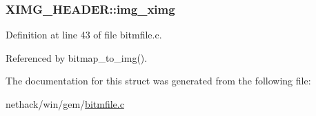 \hypertarget{structXIMG__HEADER_aaeba1879c57396ae9d15c097113b07c5}{
\subsubsection[{img\+\_\+ximg}]{ X\+I\+M\+G\+\_\+\+H\+E\+A\+D\+E\+R\+::img\+\_\+ximg}}\label{structXIMG__HEADER_aaeba1879c57396ae9d15c097113b07c5}


Definition at line 43 of file bitmfile.\+c.



Referenced by bitmap\+\_\+to\+\_\+img().



The documentation for this struct was generated from the following file\+:\begin{DoxyCompactItemize}
\item 
nethack/win/gem/\hyperlink{bitmfile_8c}{bitmfile.\+c}\end{DoxyCompactItemize}
